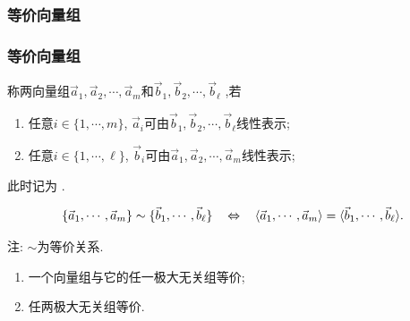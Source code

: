 \subsubsection{等价向量组}
\begin{frame}\frametitle{等价向量组}
\pp
\begin{definition}[等价]
称两向量组$\vec{a}_1,\vec{a}_2,\cdots,\vec{a}_m$和$\vec{b}_1,\vec{b}_2,\cdots,\vec{b}_\ell$ ,\pp 若
\begin{enumerate}
\item 任意$i\in\{1,\cdots,m\}$, $\vec{a}_i$可由$\vec{b}_1,\vec{b}_2,\cdots,\vec{b}_\ell$线性表示;\pp
\item 任意$i\in\{1,\cdots,\ell\}$, $\vec{b}_i$可由$\vec{a}_1,\vec{a}_2,\cdots,\vec{a}_m$线性表示;
\end{enumerate}
\pp
此时记为 .
\end{definition}
\pp
\begin{theorem}[通过生成子空间来判定是否等价]
\[\small \{\vec{a}_1,\cdots,\vec{a}_m\} \sim \{\vec{b}_1,\cdots,\vec{b}_\ell\} \quad \Leftrightarrow \quad \langle \vec{a}_1,\cdots,\vec{a}_m \rangle = \langle \vec{b}_1,\cdots,\vec{b}_\ell \rangle.\]
\end{theorem}
\pp
注: $\sim$为等价关系.
\pp
\begin{corollary}
\begin{enumerate}
\item 一个向量组与它的任一极大无关组等价; \pp
\item 任两极大无关组等价.
\end{enumerate}
\end{corollary}
\end{frame}





